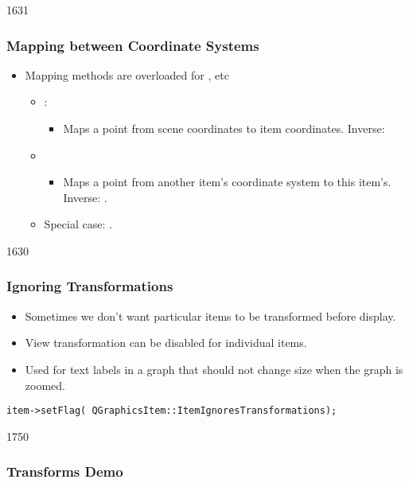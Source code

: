 \begin{slide}{1631}\frametitle{Mapping between Coordinate Systems}
\begin{itemize}
\item Mapping methods are overloaded for ,  etc
\begin{itemize}
\item {}:
    \begin{itemize}
    \item Maps a point from scene coordinates to item coordinates. Inverse:  
    \end{itemize}

\item {}
    \begin{itemize}
    \item Maps a point from another item's coordinate system to this item's. Inverse:  .
    \end{itemize}
\item Special case: .
\end{itemize}

\end{itemize}
\end{slide}


\begin{slide}{1630}\frametitle{Ignoring Transformations}
\begin{itemize}
\item Sometimes we don't want particular items to be transformed before display.
\item View transformation can be disabled for individual items.
\item Used for text labels in a graph that should not change size when the graph is zoomed.
\end{itemize}
\small{
\texttt{item->setFlag( QGraphicsItem::ItemIgnoresTransformations);}
}


\end{slide}


\begin{slide}{1750}

\frametitle{Transforms Demo}


\end{slide}


